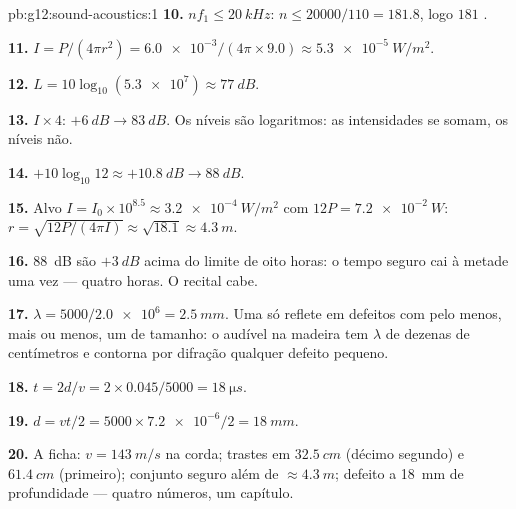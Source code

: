 \begin{solution}{pb:g12:sound-acoustics:1}
\textbf{10.} $nf_1 \le \qty{20}{kHz}$: $n \le 20000/110 = 181.8$, logo
$181$ .

\textbf{11.} $I = P/(4\pi r^2) = \num{6.0e-3}/(4\pi \times 9.0)
\approx \qty{5.3e-5}{W/m^2}$.

\textbf{12.} $L = 10\log_{10}(\num{5.3e7}) \approx \qty{77}{dB}$.

\textbf{13.} $I \times 4$: $+\qty{6}{dB} \to \qty{83}{dB}$. Os níveis
são logaritmos: as intensidades se somam, os níveis não.

\textbf{14.} $+10\log_{10}12 \approx +\qty{10.8}{dB} \to \qty{88}{dB}$.

\textbf{15.} Alvo $I = I_0 \times 10^{8.5} \approx \qty{3.2e-4}{W/m^2}$
com $12P = \qty{7.2e-2}{W}$:
$r = \sqrt{12P/(4\pi I)} \approx \sqrt{18.1} \approx \qty{4.3}{m}$.

\textbf{16.} \qty{88}{dB} são $+\qty{3}{dB}$ acima do limite de oito
horas: o tempo seguro cai à metade uma vez --- quatro horas. O recital
cabe.

\textbf{17.} $\lambda = 5000/\num{2.0e6} = \qty{2.5}{mm}$. Uma  só
reflete em defeitos com pelo menos, mais ou menos, um  de tamanho: o  audível na madeira tem $\lambda$ de dezenas de
centímetros e contorna por difração qualquer defeito pequeno.

\textbf{18.} $t = 2d/v = 2 \times 0.045/5000 = \qty{18}{\micro s}$.

\textbf{19.} $d = vt/2 = 5000 \times \num{7.2e-6}/2 = \qty{18}{mm}$.

\textbf{20.} A ficha: $v = \qty{143}{m/s}$ na corda; trastes em
$\qty{32.5}{cm}$ (décimo segundo) e $\qty{61.4}{cm}$ (primeiro);
conjunto seguro além de $\approx \qty{4.3}{m}$; defeito a \qty{18}{mm}
de profundidade --- quatro números, um capítulo.
\end{solution}
